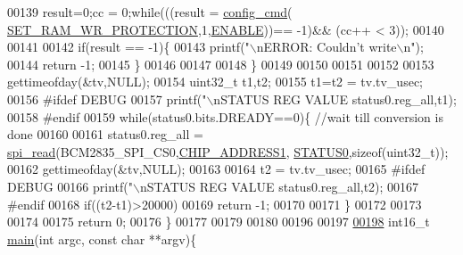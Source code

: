 \begin{DoxyCode}
00139            result=0;cc = 0;\textcolor{keywordflow}{while}(((result = \hyperlink{a00004_ga369ee0e8379941cbc2c79b90ec3292da}{config\_cmd}(
      \hyperlink{a00042_a5b534b9caab512045a6e762f3930a501}{SET\_RAM\_WR\_PROTECTION},1,\hyperlink{a00036_a514ad415fb6125ba296793df7d1a468a}{ENABLE}))== -1)&& (cc++ < 3)); 
00140          
00141            
00142            \textcolor{keywordflow}{if}(result == -1)\{
00143                     printf(\textcolor{stringliteral}{"\(\backslash\)nERROR: Couldn't write\(\backslash\)n"});  
00144                     \textcolor{keywordflow}{return} -1;
00145            \}
00146            
00147             
00148            \}
00149            
00150            
00151            
00152         
00153            gettimeofday(&tv,NULL);
00154            uint32\_t t1,t2;
00155            t1=t2 = tv.tv\_usec;  
00156 \textcolor{preprocessor}{           #ifdef DEBUG            }
00157 \textcolor{preprocessor}{}           printf(\textcolor{stringliteral}{"\(\backslash\)nSTATUS REG VALUE %
      status0.reg\_all,t1);
00158 \textcolor{preprocessor}{           #endif}
00159 \textcolor{preprocessor}{}           \textcolor{keywordflow}{while}(status0.bits.DREADY==0)\{ \textcolor{comment}{//wait till conversion is done}
00160          
00161              status0.reg\_all = \hyperlink{a00006_ga7ad9f65ee46aca507374096506a0b1c4}{spi\_read}(BCM2835\_SPI\_CS0,\hyperlink{a00036_a94de2b046db6e10257ef4481c0a15eaa}{CHIP\_ADDRESS1},
      \hyperlink{a00035_aaf584f70289e5fd799fef97c85bb97ee}{STATUS0},\textcolor{keyword}{sizeof}(uint32\_t));
00162              gettimeofday(&tv,NULL);
00163              
00164              t2 = tv.tv\_usec;   
00165 \textcolor{preprocessor}{             #ifdef DEBUG }
00166 \textcolor{preprocessor}{}             printf(\textcolor{stringliteral}{"\(\backslash\)nSTATUS REG VALUE %
      status0.reg\_all,t2);  
00167 \textcolor{preprocessor}{             #endif}
00168 \textcolor{preprocessor}{}             \textcolor{keywordflow}{if}((t2-t1)>20000)
00169              \textcolor{keywordflow}{return} -1;
00170              
00171            \}
00172            
00173            
00174 
00175   \textcolor{keywordflow}{return} 0;
00176 \}
00177 
00179  
00180 
00196 
00197 
\hypertarget{a00034_source_l00198}{}\hyperlink{a00002_ga3ba649a584853038d5fd50ad1751379d}{00198} int16\_t \hyperlink{a00002_ga3ba649a584853038d5fd50ad1751379d}{main}(\textcolor{keywordtype}{int} argc, \textcolor{keyword}{const} \textcolor{keywordtype}{char} **argv)\{
}}
\end{DoxyCode}
